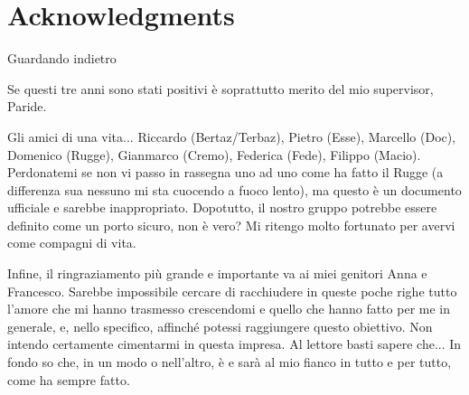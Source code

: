 \chapter*{Acknowledgments}



Guardando indietro

Se questi tre anni sono stati positivi è soprattutto merito del mio supervisor, Paride.



Gli amici di una vita...
Riccardo (Bertaz/Terbaz), Pietro (Esse), Marcello (Doc), Domenico (Rugge), Gianmarco (Cremo), Federica (Fede), Filippo (Macio).
Perdonatemi se non vi passo in rassegna uno ad uno come ha fatto il Rugge (a differenza sua nessuno mi sta cuocendo a fuoco lento), ma questo è un documento ufficiale e sarebbe inappropriato.
Dopotutto, il nostro gruppo potrebbe essere definito come un porto sicuro, non è vero?
Mi ritengo molto fortunato per avervi come compagni di vita.

Infine, il ringraziamento più grande e importante va ai miei genitori Anna e Francesco.
Sarebbe impossibile cercare di racchiudere in queste poche righe tutto l'amore che mi hanno trasmesso crescendomi e quello che hanno fatto per me in generale, e, nello specifico, affinché potessi raggiungere questo obiettivo. 
Non intendo certamente cimentarmi in questa impresa.
Al lettore basti sapere che...
In fondo so che, in un modo o nell'altro, è e sarà al mio fianco in tutto e per tutto, come ha sempre fatto.
